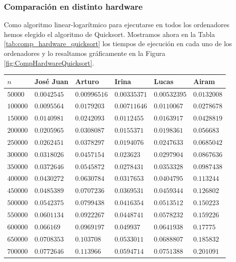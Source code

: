 \documentclass[12pt]{article}
\begin{document}
    \subsubsection{Comparación en distinto hardware}
    Como algoritmo linear-logarítmico para ejecutarse en todos los ordenadores hemos elegido el algoritmo de Quicksort. Mostramos ahora en la Tabla \ref{tab:comp_hardware_quicksort} los tiempos de ejecución en cada uno de los ordenadores y lo resaltamos gráficamente en la Figura \ref{fig:CompHardwareQuicksort}.
    \begin{table}
        \centering
        \begin{tabular}{|l|l|l|l|l|l|}
            \hline
            $n$ & José Juan & Arturo & Irina & Lucas & Airam \\
            \hline
            $50000$ & $0.0042545$ & $0.00996516$ & $0.00335371$ & $0.00532395$ & $0.0132008$ \\
            $100000$ & $0.0095564$ & $0.0179203$ & $0.00711646$ & $0.0110067$ & $0.0278678$ \\
            $150000$ & $0.0140981$ & $0.0242093$ & $0.0112455$ & $0.0163917$ & $0.0428819$ \\
            $200000$ & $0.0205965$ & $0.0308087$ & $0.0155371$ & $0.0198361$ & $0.056683$ \\
            $250000$ & $0.0262451$ & $0.0378297$ & $0.0194076$ & $0.0247633$ & $0.0685042$ \\
            $300000$ & $0.0318026$ & $0.0457154$ & $0.023623$ & $0.0297904$ & $0.0867636$ \\
            $350000$ & $0.0372646$ & $0.0545872$ & $0.0278431$ & $0.0353328$ & $0.0987438$ \\
            $400000$ & $0.0430272$ & $0.0630784$ & $0.0317653$ & $0.0404795$ & $0.113244$ \\
            $450000$ & $0.0485389$ & $0.0707236$ & $0.0369531$ & $0.0459344$ & $0.126802$ \\
            $500000$ & $0.0542375$ & $0.0799438$ & $0.0416354$ & $0.0513512$ & $0.150223$ \\
            $550000$ & $0.0601134$ & $0.0922267$ & $0.0448741$ & $0.0578232$ & $0.159226$ \\
            $600000$ & $0.066169$ & $0.0969197$ & $0.049937$ & $0.0641938$ & $0.17775$ \\
            $650000$ & $0.0708353$ & $0.103708$ & $0.0533011$ & $0.0688807$ & $0.185832$ \\
            $700000$ & $0.0772646$ & $0.113966$ & $0.0594714$ & $0.0751388$ & $0.201091$ \\

\end{tabular}
\end{table}
\end{document}
